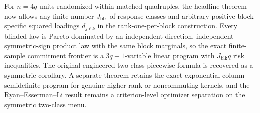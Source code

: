 For \(n=4q\) units randomized within matched quadruples, the headline theorem now allows any finite number \(J_{\mathrm{blk}}\) of response classes and arbitrary positive block-specific squared loadings \(d_{j\ell k}\) in the rank-one-per-block construction. Every blinded law is Pareto-dominated by an independent-direction, independent-symmetric-sign product law with the same block marginals, so the exact finite-sample commitment frontier is a \(3q+1\)-variable linear program with \(J_{\mathrm{blk}}q\) risk inequalities. The original engineered two-class piecewise formula is recovered as a symmetric corollary. A separate theorem retains the exact exponential-column semidefinite program for genuine higher-rank or noncommuting kernels, and the Ryan--Esserman--Li result remains a criterion-level optimizer separation on the symmetric two-class menu.